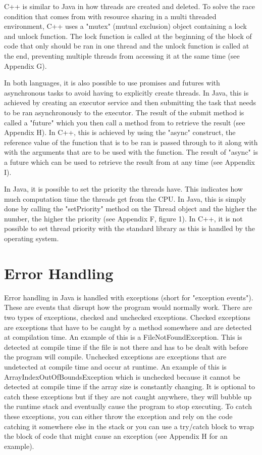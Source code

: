 \documentclass[]{report}
\begin{document}
C++ is similar to Java in how threads are created and deleted. To solve the race condition that comes from with resource sharing in a multi threaded environment, C++ uses a "mutex" (mutual exclusion) object containing a lock and unlock function. The lock function is called at the beginning of the block of code that only should be ran in one thread and the unlock function is called at the end, preventing multiple threads from accessing it at the same time (see Appendix G).\cite{ConcurrencyC++}

In both languages, it is also possible to use promises and futures with asynchronous tasks to avoid having to explicitly create threads. In Java, this is achieved by creating an executor service and then submitting the task that needs to be ran asynchronously to the executor. The result of the submit method is called a "future" which you then call a method from to retrieve the result (see Appendix H). In C++, this is achieved by using the "async" construct, the reference value of the function that is to be ran is passed through to it along with with the arguments that are to be used with the function. The result of "async" is a future which can be used to retrieve the result from at any time (see Appendix I).

In Java, it is possible to set the priority the threads have. This indicates how much computation time the threads get from the CPU. In Java, this is simply done by calling the "setPriority" method on the Thread object and the higher the number, the higher the priority (see Appendix F, figure 1). In C++, it is not possible to set thread priority with the standard library as this is handled by the operating system.

\section{Error Handling}
Error handling in Java is handled with exceptions (short for "exception events"). These are events that disrupt how the program would normally work. There are two types of exceptions, checked and unchecked exceptions. Checked exceptions are exceptions that have to be caught by a method somewhere and are detected at compilation time. An example of this is a FileNotFoundException. This is detected at compile time if the file is not there and has to be dealt with before the program will compile. Unchecked exceptions are exceptions that are undetected at compile time and occur at runtime. An example of this is ArrayIndexOutOfBoundsException which is unchecked because it cannot be detected at compile time if the array size is constantly changing. It is optional to catch these exceptions but if they are not caught anywhere, they will bubble up the runtime stack and eventually cause the program to stop executing. To catch these exceptions, you can either throw the exception and rely on the code catching it somewhere else in the stack or you can use a try/catch block to wrap the block of code that might cause an exception (see Appendix H for an example).\cite{ExceptionsJava}
\end{document}
